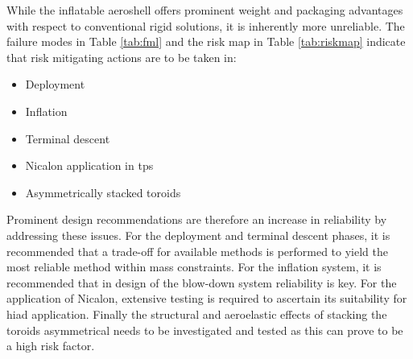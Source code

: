 While the inflatable aeroshell offers prominent weight and packaging advantages with respect to conventional rigid solutions, it is inherently more unreliable. The failure modes in Table \ref{tab:fml} and the risk map in Table \ref{tab:riskmap} indicate that risk mitigating actions are to be taken in:
\begin{itemize}
\item Deployment
\item Inflation
\item Terminal descent
\item Nicalon application in \gls{tps}
\item Asymmetrically stacked toroids
\end{itemize}
Prominent design recommendations are therefore an increase in reliability by addressing these issues. For the deployment and terminal descent phases, it is recommended that a trade-off for available methods is performed to yield the most reliable method within mass constraints. For the inflation system, it is recommended that in design of the blow-down system reliability is key. For the application of Nicalon, extensive testing is required to ascertain its suitability for \gls{hiad} application. Finally the structural and aeroelastic effects of stacking the toroids asymmetrical needs to be investigated and tested as this can prove to be a high risk factor.